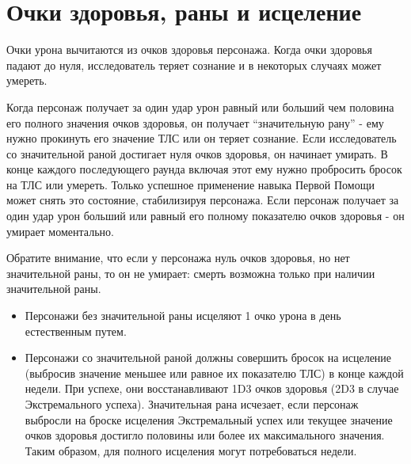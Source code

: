 \documentclass[letterpaper,twocolumn,openany, twoside, 11pt, usenames]{cocbook}
\begin{document}
\smallbreak
\noindent {}

\section*{Очки здоровья, раны и исцеление}

Очки урона вычитаются из очков здоровья персонажа. Когда очки здоровья падают до нуля, исследователь теряет сознание и в некоторых случаях может умереть.

Когда персонаж получает за один удар урон равный или больший чем половина его полного значения очков здоровья, он получает ``значительную рану'' - ему нужно прокинуть его значение ТЛС или он теряет сознание. Если исследователь со значительной раной достигает нуля очков здоровья, он начинает умирать. В конце каждого последующего раунда включая этот ему нужно пробросить бросок на ТЛС или умереть. Только успешное применение навыка Первой Помощи может снять это состояние, стабилизируя персонажа. Если персонаж получает за один удар урон больший или равный его полному показателю очков здоровья - он умирает моментально.

Обратите внимание, что если у персонажа нуль очков здоровья, но нет значительной раны, то он не умирает: смерть возможна только при наличии значительной раны.

\begin{itemize}[leftmargin=4mm]
  \item Персонажи без значительной раны исцеляют 1 очко урона в день естественным путем.
  \item Персонажи со значительной раной должны совершить бросок на исцеление (выбросив значение меньшее или равное их показателю ТЛС) в конце каждой недели. При успехе, они восстанавливают 1D3 очков здоровья (2D3 в случае Экстремального успеха). Значительная рана исчезает, если персонаж выбросли на броске исцеления Экстремальный успех или текущее значение очков здоровья достигло половины или более их максимального значения. Таким образом, для полного исцеления могут потребоваться недели.
\end{itemize}
\end{document}
